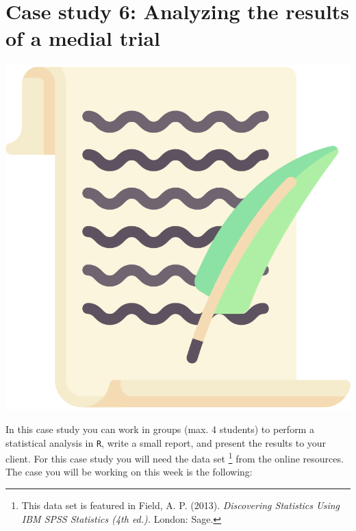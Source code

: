 
\begin{minipage}{0.8\textwidth}
\section{Case study 6: Analyzing the results of a medial trial}
\end{minipage}%
\hfill%
\begin{minipage}{0.1\textwidth}
\includegraphics[width=\linewidth]{Files/Images/lettericon.pdf}
\end{minipage}
\vspace*{.1cm}

In this case study you can work in groups (max. 4 students) to perform a statistical analysis in \texttt{R}, write a small report, and present the results to your client. For this case study you will need the data set \footnote{This data set is featured in Field, A. P. (2013). \textit{Discovering Statistics Using IBM SPSS Statistics (4th ed.).} London: Sage.} from the online resources. The case you will be working on this week is the following: \\

